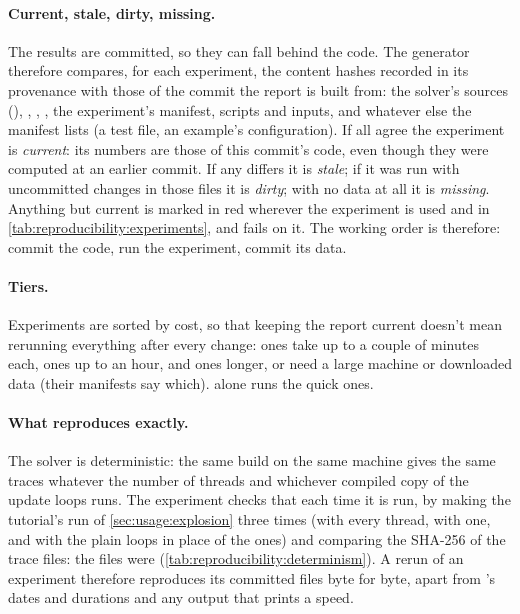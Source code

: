 \paragraph{Current, stale, dirty, missing.} The results are committed, so they can fall
behind the code. The generator therefore compares, for each experiment, the content hashes
recorded in its provenance with those of the commit the report is built from: the solver's
sources (), , , , the
experiment's manifest, scripts and inputs, and whatever else the manifest lists (a test
file, an example's configuration). If all agree the experiment is \emph{current}: its
numbers are those of this commit's code, even though they were computed at an earlier commit.
If any differs it is \emph{stale}; if it was run with uncommitted changes in those files it
is \emph{dirty}; with no data at all it is \emph{missing}. Anything but current is marked in
red wherever the experiment is used and in \cref{tab:reproducibility:experiments}, and
 fails on it. The working order is therefore: commit the code,
run the experiment, commit its data.

\paragraph{Tiers.} Experiments are sorted by cost, so that keeping the report current
doesn't mean rerunning everything after every change:  ones take up to a couple
of minutes each,  ones up to an hour, and  ones longer, or need a
large machine or downloaded data (their manifests say which).  alone
runs the quick ones.

\paragraph{What reproduces exactly.} The solver is deterministic: the same build on the
same machine gives the same traces whatever the number of threads and whichever compiled
copy of the update loops runs. The experiment  checks that
each time it is run, by making the tutorial's run of \cref{sec:usage:explosion} three times
(with every thread, with one, and with the plain loops in place of the
\texttt{} ones) and comparing the SHA-256 of
the trace files: the  files were
\textbf{} (\cref{tab:reproducibility:determinism}).
A rerun of an experiment therefore reproduces its committed files byte for byte, apart from
's dates and durations and any output that prints a speed.

